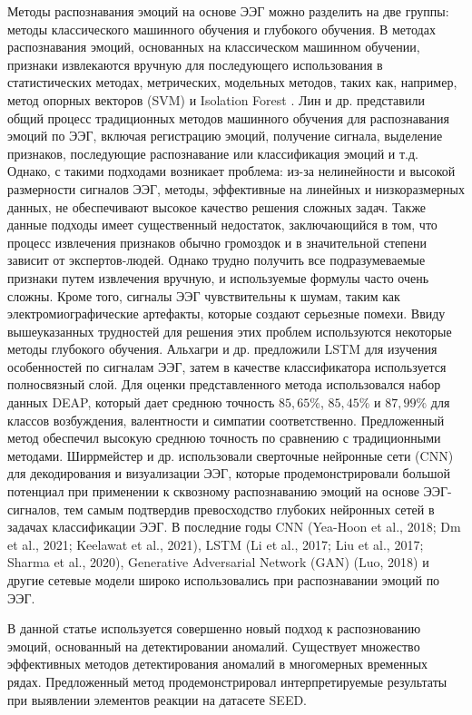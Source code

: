 \documentclass{article}
\begin{document}
Методы распознавания эмоций на основе ЭЭГ можно разделить на две группы: методы классического машинного обучения и глубокого обучения. В методах распознавания эмоций, основанных на классическом машинном обучении, признаки извлекаются вручную для последующего использования в статистических методах, метрических, модельных методов, таких как, например, метод опорных векторов (SVM) \citet{scholkopfsuppor} и Isolation Forest \citet{liu2008isolation}. Лин и др. \citet{sensors18} представили общий процесс традиционных методов машинного обучения для распознавания эмоций по ЭЭГ, включая регистрацию эмоций, получение сигнала, выделение признаков, последующие распознавание или классификация эмоций и т.д. Однако, с такими подходами возникает проблема: из-за нелинейности и высокой размерности сигналов ЭЭГ, методы, эффективные на линейных и низкоразмерных данных, не обеспечивают высокое качество решения сложных задач. Также данные подходы имеет существенный недостаток, заключающийся в том, что процесс извлечения признаков обычно громоздок и в значительной степени зависит от экспертов-людей. Однако трудно получить все подразумеваемые признаки путем извлечения вручную, и используемые формулы часто очень сложны. Кроме того, сигналы ЭЭГ чувствительны к шумам, таким как электромиографические артефакты, которые создают серьезные помехи. Ввиду вышеуказанных трудностей для решения этих проблем используются некоторые методы глубокого обучения. Альхагри и др. \citep{lstm} предложили LSTM для изучения особенностей по сигналам ЭЭГ, затем в качестве классификатора используется полносвязный слой. Для оценки представленного метода использовался набор данных DEAP, который дает среднюю точность $85,65\%$, $85,45\%$ и $87,99\%$ для классов возбуждения, валентности и симпатии соответственно. Предложенный метод обеспечил высокую среднюю точность по сравнению с традиционными методами. Ширрмейстер и др. \citep{cnn} использовали сверточные нейронные сети (CNN) для декодирования и визуализации ЭЭГ, которые продемонстрировали большой потенциал при применении к сквозному распознаванию эмоций на основе ЭЭГ-сигналов, тем самым подтвердив превосходство глубоких нейронных сетей в задачах классификации ЭЭГ. В последние годы CNN (Yea-Hoon et al., 2018; Dm et al., 2021; Keelawat et al., 2021), LSTM (Li et al., 2017; Liu et al., 2017; Sharma et al., 2020), Generative Adversarial Network (GAN) (Luo, 2018) и другие сетевые модели широко использовались при распознавании эмоций по ЭЭГ.

В данной статье используется совершенно новый подход к распознованию эмоций, основанный на детектировании аномалий. Существует множество эффективных методов детектирования аномалий в многомерных временных рядах. Предложенный метод продемонстрировал интерпретируемые результаты при выявлении элементов реакции на датасете SEED.
\end{document}
